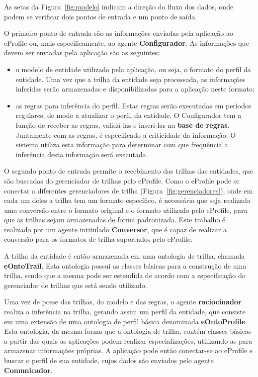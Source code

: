 \documentclass[times, 10pt, twocolumn]{article}
\begin{document}
As setas da Figura~\ref{fig:modelo} indicam a direção do fluxo dos dados, onde podem se verificar dois pontos de entrada e um ponto de saída.

O primeiro ponto de entrada são as informações enviadas pela aplicação ao eProfile ou, mais especificamente, ao agente {\bf Configurador}. As informações que devem ser enviadas pela aplicação são as seguintes:

\begin{itemize}

\item o modelo de entidade utilizado pela aplicação, ou seja, o formato do perfil da entidade. Uma vez que a trilha da entidade seja processada, as informações inferidas serão armazenadas e disponibilizadas para a aplicação neste formato;

\item as regras para inferência do perfil. Estas regras serão executadas em períodos regulares, de modo a atualizar o perfil da entidade. O Configurador tem a função de receber as regras, validá-las e inseri-las na \textbf{base de regras}. Juntamente com as regras, é especificado a criticidade da informação. O sistema utiliza esta informação para determinar com que frequência a inferência desta informação será executada.

\end{itemize}

O segundo ponto de entrada permite o recebimento das trilhas das entidades, que são buscadas do gerenciador de trilhas pelo eProfile. Como o eProfile pode se conectar a diferentes gerenciadores de trilha (Figura~\ref{fig:gerenciadores}), onde em cada um deles a trilha tem um formato específico, é necessário que seja realizada uma conversão entre o formato original e o formato utilizado pelo eProfile, para que as trilhas sejam armazenadas de forma padronizada. Este trabalho é realizado por um agente intitulado {\bf Conversor}, que é capaz de realizar a conversão para os formatos de trilha suportados pelo eProfile.

A trilha da entidade é então armazenada em uma ontologia de trilha, chamada {\bf eOntoTrail}. Esta ontologia possui as classes básicas para a construção de uma trilha, sendo que a mesma pode ser estendida de acordo com a especificação do gerenciador de trilhas que está sendo utilizado.

Uma vez de posse das trilhas, do modelo e das regras, o agente \textbf{raciocinador} realiza a inferência na trilha, gerando assim um perfil da entidade, que consiste em uma extensão de uma ontologia de perfil básica denominada {\bf eOntoProfile}. Esta ontologia, da mesma forma que a ontologia de trilha, contém classes básicas a partir das quais as aplicações podem realizar especializações, utilizando-as para armazenar informações próprias. A aplicação pode então conectar-se ao eProfile e buscar o perfil de sua entidade, cujos dados são enviados pelo agente \textbf{Comunicador}.
\end{document}
